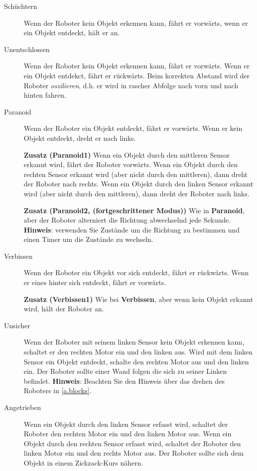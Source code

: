 
\begin{description}

\item[Schüchtern] Wenn der Roboter kein Objekt erkennen kann, fährt er vorwärts, wenn er ein Objekt entdeckt, hält er an. 

\item[Unentschlossen] Wenn der Roboter kein Objekt erkennen kann, fährt er vorwärts. Wenn er ein Objekt entdekct, fährt er rückwärts. Beim korrekten Abstand wird der Roboter \emph{oszilieren}, d.h. er wird in rascher Abfolge nach vorn und nach hinten fahren. 

\item[Paranoid] Wenn der Roboter ein Objekt entdeckt, fährt er vorwärts. Wenn er kein Objekt entdeckt, dreht er nach links.  

\textbf{Zusatz (Paranoid1)} Wenn ein Objekt durch den mittleren Sensor erkannt wird, fährt der Roboter vorwärts. Wenn ein Objekt durch den rechten Sensor erkannt wird (aber nicht durch den mittleren), dann dreht der Roboter nach rechts. Wenn ein Objekt durch den linken Sensor erkannt wird (aber nicht durch den mittleren), dann dreht der Roboter nach links. 

\textbf{Zusatz (Paranoid2, (fortgeschrittener Modus))} Wie in \textbf{Paranoid}, aber der Roboter alterniert die Richtung abwechselnd jede Sekunde. \textbf{Hinweis}:
verwenden Sie Zustände um die Richtung zu bestimmen und einen Timer um die Zustände zu wechseln. 

\item[Verbissen] Wenn der Roboter ein Objekt vor sich entdeckt, fährt er rückwärts. Wenn er eines hinter sich entdeckt, fährt er vorwärts.

\textbf{Zusatz (Verbissen1)} Wie bei \textbf{Verbissen}, aber wenn kein Objekt erkannt wird, hält der Roboter an.

\item[Unsicher] Wenn der Roboter mit seinem linken Sensor kein Objekt erkennen kann, schaltet er den rechten Motor ein und den linken aus. Wird mit dem linken Sensor ein Objekt entdeckt, schalte den rechten Motor aus und den linken ein. Der Roboter sollte einer Wand folgen die sich zu seiner Linken befindet. \textbf{Hinweis}: Beachten Sie den Hinweis über das drehen des Roboters in \cref{a.blocks}.

\item[Angetrieben] Wenn ein Objekt durch den linken Sensor erfasst wird, schaltet der Roboter den rechten Motor ein und den linken Motor aus. Wenn ein Objekt durch den rechten Sensor erfasst wird, schaltet der Roboter den linken Motor ein und den rechts Motor aus. Der Roboter sollte sich dem Objekt in einem Zickzack-Kurs nähern.


\end{description}
